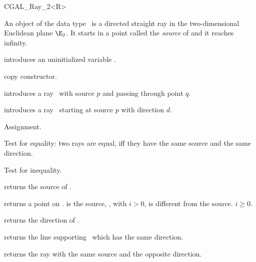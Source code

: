
\begin {classtemplate} {CGAL_Ray_2<R>}

An object  of the data type \classname\ is a directed
straight ray in the two-dimensional Euclidean plane $\E_2$. It starts
in a  point called the {\em source} of   and it reaches infinity.

\creation
{}


\hidden {}
             {introduces an uninitialized variable \var.}

\hidden {}
 	    {copy constructor.}

            {introduces a ray \var\ 
             with source $p$ and passing through point $q$.}

            {introduces a ray \var\ starting at source $p$ with 
             direction $d$.}

\operations
\threecolumns{5cm}{4cm}

\hidden {}
        {Assignment.}

       {Test for equality: two rays are equal, iff they have the same 
        source and the same direction.}

       {Test for inequality.}



       {returns the source of \var.}


       {returns a point on \var.  is the source,
        \CCstyle{point(i)}, with $i>0$, is different from the 
        source. \precond $i \geq 0$.}

       {returns the direction of \var.}

       {returns the line supporting \var\ which has the same direction.}

       {returns the ray with the same source and the opposite direction.}


\end{classtemplate}
